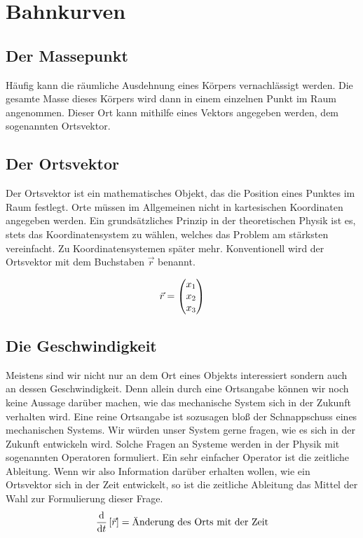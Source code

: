 \section{Bahnkurven}
\subsection{Der Massepunkt}
Häufig kann die räumliche Ausdehnung eines Körpers vernachlässigt werden. Die gesamte Masse dieses Körpers wird dann in einem einzelnen Punkt im Raum angenommen. Dieser Ort kann mithilfe eines Vektors angegeben werden, dem sogenannten Ortsvektor.

\subsection{Der Ortsvektor}
Der Ortsvektor ist ein mathematisches Objekt, das die Position eines Punktes im Raum festlegt. Orte müssen im Allgemeinen nicht in kartesischen Koordinaten angegeben werden. Ein grundsätzliches Prinzip in der theoretischen Physik ist es, stets das Koordinatensystem zu wählen, welches das Problem am stärksten vereinfacht. Zu Koordinatensystemen später mehr. 
Konventionell wird der Ortsvektor mit dem Buchstaben $\vec{r}$ benannt.

\begin{align}
	\vec{r} = \begin{pmatrix} x_1\\x_2\\x_3 \end{pmatrix} 
\end{align}

\subsection{Die Geschwindigkeit}
Meistens sind wir nicht nur an dem Ort eines Objekts interessiert sondern auch an dessen Geschwindigkeit. Denn allein durch eine Ortsangabe können wir noch keine Aussage darüber machen, wie das mechanische System sich in der Zukunft verhalten wird. Eine reine Ortsangabe ist sozusagen bloß der Schnappschuss eines mechanischen Systems. 
Wir würden unser System gerne fragen, wie es sich in der Zukunft entwickeln wird. Solche Fragen an Systeme werden in der Physik mit sogenannten Operatoren formuliert. Ein sehr einfacher Operator ist die zeitliche Ableitung. 
Wenn wir also Information darüber erhalten wollen, wie ein Ortsvektor sich in der Zeit entwickelt, so ist die zeitliche Ableitung das Mittel der Wahl zur Formulierung dieser Frage. 
\begin{align}
	\frac{\text{d}}{\text{d}t}\left[\vec{r}\right] = \text{Änderung des Orts mit der Zeit}
\end{align}

